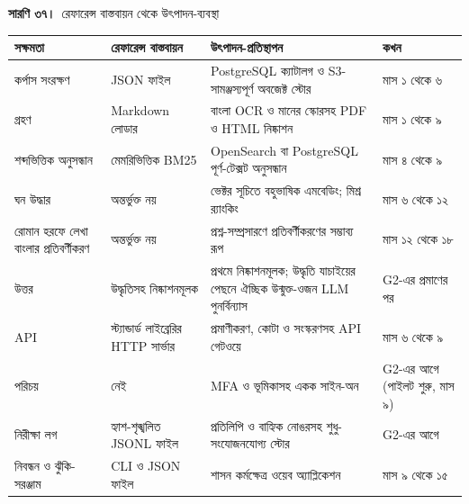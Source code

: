 \documentclass[border=10pt]{standalone}
\begin{document}
\begin{minipage}{17cm}
{\large\bfseries সারণি ৩৭।}\ {\large রেফারেন্স বাস্তবায়ন থেকে উৎপাদন-ব্যবস্থা}\par\vspace{7pt}
\small
{}
\begin{tabularx}{\linewidth}{@{}>{\hsize=0.916\hsize\raggedright\arraybackslash}X>{\hsize=1.060\hsize\raggedright\arraybackslash}X>{\hsize=1.398\hsize\raggedright\arraybackslash}X>{\hsize=0.627\hsize\raggedright\arraybackslash}X@{}}
\arrayrulecolor{bapilrule}\toprule
\rowcolor{white}\textbf{সক্ষমতা} & \textbf{রেফারেন্স বাস্তবায়ন} & \textbf{উৎপাদন-প্রতিস্থাপন} & \textbf{কখন} \\
\midrule
কর্পাস সংরক্ষণ & JSON ফাইল & PostgreSQL ক্যাটালগ ও S3-সামঞ্জস্যপূর্ণ অবজেক্ট স্টোর & মাস ১ থেকে ৬ \\
গ্রহণ & Markdown লোডার & বাংলা OCR ও মানের স্কোরসহ PDF ও HTML নিষ্কাশন & মাস ১ থেকে ৯ \\
শব্দভিত্তিক অনুসন্ধান & মেমরিভিত্তিক BM25 & OpenSearch বা PostgreSQL পূর্ণ-টেক্সট অনুসন্ধান & মাস ৪ থেকে ৯ \\
ঘন উদ্ধার & অন্তর্ভুক্ত নয় & ভেক্টর সূচিতে বহুভাষিক এমবেডিং; মিশ্র র‍্যাংকিং & মাস ৬ থেকে ১২ \\
রোমান হরফে লেখা বাংলার প্রতিবর্ণীকরণ & অন্তর্ভুক্ত নয় & প্রশ্ন-সম্প্রসারণে প্রতিবর্ণীকরণের সম্ভাব্য রূপ & মাস ১২ থেকে ১৮ \\
উত্তর & উদ্ধৃতিসহ নিষ্কাশনমূলক & প্রথমে নিষ্কাশনমূলক; উদ্ধৃতি যাচাইয়ের পেছনে ঐচ্ছিক উন্মুক্ত-ওজন LLM পুনর্বিন্যাস & G2-এর প্রমাণের পর \\
API & স্ট্যান্ডার্ড লাইব্রেরির HTTP সার্ভার & প্রমাণীকরণ, কোটা ও সংস্করণসহ API গেটওয়ে & মাস ৬ থেকে ৯ \\
পরিচয় & নেই & MFA ও ভূমিকাসহ একক সাইন-অন & G2-এর আগে (পাইলট শুরু, মাস ৯) \\
নিরীক্ষা লগ & হ্যাশ-শৃঙ্খলিত JSONL ফাইল & প্রতিলিপি ও বাহ্যিক নোঙরসহ শুধু-সংযোজনযোগ্য স্টোর & G2-এর আগে \\
নিবন্ধন ও ঝুঁকি-সরঞ্জাম & CLI ও JSON ফাইল & শাসন কর্মক্ষেত্র ওয়েব অ্যাপ্লিকেশন & মাস ৯ থেকে ১৫ \\
\bottomrule
\end{tabularx}
\par{}
\end{minipage}
\end{document}
